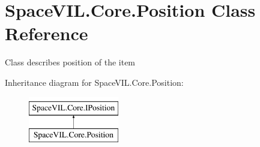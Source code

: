 \hypertarget{class_space_v_i_l_1_1_core_1_1_position}{}\section{Space\+V\+I\+L.\+Core.\+Position Class Reference}
\label{class_space_v_i_l_1_1_core_1_1_position}


Class describes position of the item  


Inheritance diagram for Space\+V\+I\+L.\+Core.\+Position\+:\begin{figure}[H]
\begin{center}
\leavevmode
\includegraphics[height=2.000000cm]{class_space_v_i_l_1_1_core_1_1_position}
\end{center}
\end{figure}
